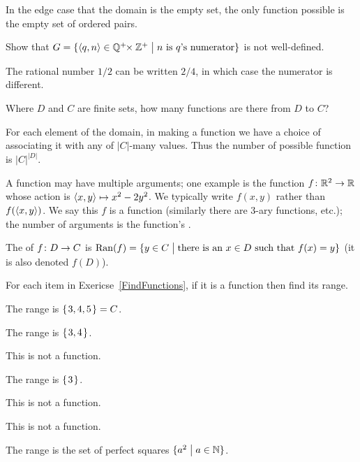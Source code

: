 \documentclass{ibl}  %
\begin{document}
In the edge case that the domain is the empty set, the only function possible
is the empty set of ordered pairs.

\begin{problem}[\maxlength]
Show that
$G=\{\langle q,n\rangle\in \mathbb{Q}^+\!\!\times\mathbb{Z}^+ \bigm| \text{$n$ is $q$'s numerator}\}$
is not well-defined.
\begin{answer}
The rational number $1/2$ can be written $2/4$, in which case the numerator 
is different.  
\end{answer}
\end{problem}

\begin{problem}[\maxlength]
Where $D$ and $C$ are finite sets,
how many functions are there from $D$ to $C$?
\begin{answer}
For each element of the domain, in making a function we have a choice 
of associating it with any of $|C|$-many values.
Thus the number of possible function is $|C|^{|D|}$.
\end{answer}
\end{problem}

A function may have multiple arguments; one example is the function
$\mbox{$f\colon \mathbb{R}^2\to \mathbb{R}$}$ whose action is 
$\langle x,y\rangle\mapsto x^2-2y^2$.
We typically write 
$f(x,y)$ rather than
$f(\langle x,y\rangle)$.
We say this $f$ is a  function (similarly there
are $3$-ary functions, etc.);
the number of arguments is the function's .

\begin{df}
The  of $\mbox{$f\colon D\to C$}$ is 
$\operatorname{Ran}(f)=\{y\in C \bigm| \text{there is an $x\in D$ such that $f(x)=y$}\}$
(it is also denoted $f(D)$).
\end{df}

\begin{problem}
For each item in Exericse~\ref{FindFunctions}, 
if it is a function then find its range.  
\begin{answer}
\begin{items}
\item The range is $\mbox{$\{\hspace{0.1em}3,4,5\hspace{0.1em}\}$}=C$.    
\item The range is $\mbox{$\{\hspace{0.1em}3,4\hspace{0.1em}\}$}$.
\item This is not a function.   
\item The range is $\mbox{$\{\hspace{0.1em}3\hspace{0.1em}\}$}$.
\item This is not a function.   
\item This is not a function.   
\item The range is the set of perfect squares $\{a^2 \bigm| a\in\mathbb{N}\}$.   
\end{items}
\end{answer}
\end{problem}
\end{document}
